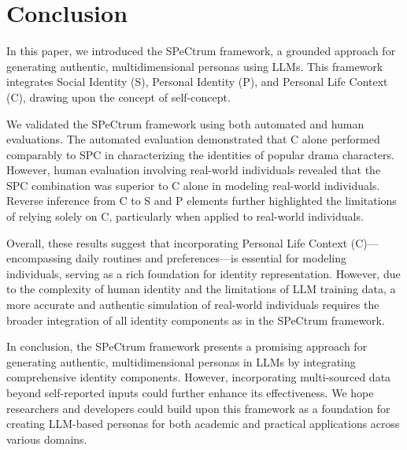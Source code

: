 \section{Conclusion}
In this paper, we introduced the SPeCtrum framework, a grounded approach for generating authentic, multidimensional personas using LLMs. This framework integrates Social Identity (S), Personal Identity (P), and Personal Life Context (C), drawing upon the concept of self-concept.


We validated the SPeCtrum framework using both automated and human evaluations. The automated evaluation demonstrated that C alone performed comparably to SPC in characterizing the identities of popular drama characters. However, human evaluation involving real-world individuals revealed that the SPC combination was superior to C alone in modeling real-world individuals. Reverse inference from C to S and P elements further highlighted the limitations of relying solely on C, particularly when applied to real-world individuals. 

Overall, these results suggest that incorporating Personal Life Context (C)—encompassing daily routines and preferences—is essential for modeling individuals, serving as a rich foundation for identity representation. However, due to the complexity of human identity and the limitations of LLM training data, a more accurate and authentic simulation of real-world individuals requires the broader integration of all identity components as in the SPeCtrum framework.

In conclusion, the SPeCtrum framework presents a promising approach for generating authentic, multidimensional personas in LLMs by integrating comprehensive identity components. However, incorporating multi-sourced data beyond self-reported inputs could further enhance its effectiveness. We hope researchers and developers could build upon this framework as a foundation for creating LLM-based personas for both academic and practical applications across various domains.



